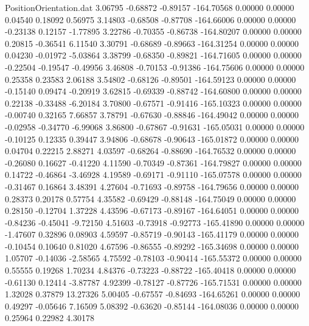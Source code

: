\begin{filecontents}{PositionOrientation.dat}
   3.06795   -0.68872   -0.89157  -164.70568    0.00000    0.00000    0.04540    0.18092    0.56975
   3.14803   -0.68508   -0.87708  -164.66006    0.00000    0.00000   -0.23138    0.12157   -1.77895
   3.22786   -0.70355   -0.86738  -164.80207    0.00000    0.00000    0.20815   -0.36541    6.11540
   3.30791   -0.68689   -0.89663  -164.31254    0.00000    0.00000    0.04230   -0.01972   -5.03864
   3.38799   -0.68350   -0.89821  -164.71605    0.00000    0.00000   -0.22504   -0.19547   -0.49956
   3.46808   -0.70153   -0.91386  -164.75606    0.00000    0.00000    0.25358    0.23583    2.06188
   3.54802   -0.68126   -0.89501  -164.59123    0.00000    0.00000   -0.15140    0.09474   -0.20919
   3.62815   -0.69339   -0.88742  -164.60800    0.00000    0.00000    0.22138   -0.33488   -6.20184
   3.70800   -0.67571   -0.91416  -165.10323    0.00000    0.00000   -0.00740    0.32165    7.66857
   3.78791   -0.67630   -0.88846  -164.49042    0.00000    0.00000   -0.02958   -0.34770   -6.99068
   3.86800   -0.67867   -0.91631  -165.05031    0.00000    0.00000   -0.10125    0.12335    0.39447
   3.94806   -0.68678   -0.90643  -165.01872    0.00000    0.00000    0.04704    0.22215    2.88271
   4.03597   -0.68264   -0.88690  -164.76532    0.00000    0.00000   -0.26080    0.16627   -0.41220
   4.11590   -0.70349   -0.87361  -164.79827    0.00000    0.00000    0.14722   -0.46864   -3.46928
   4.19589   -0.69171   -0.91110  -165.07578    0.00000    0.00000   -0.31467    0.16864    3.48391
   4.27604   -0.71693   -0.89758  -164.79656    0.00000    0.00000    0.28373    0.20178    0.57754
   4.35582   -0.69429   -0.88148  -164.75049    0.00000    0.00000    0.28150   -0.12704    1.37228
   4.43596   -0.67173   -0.89167  -164.64051    0.00000    0.00000   -0.84236   -0.45041   -9.72150
   4.51603   -0.73918   -0.92773  -165.41890    0.00000    0.00000   -1.47607    0.32896    0.08903
   4.59597   -0.85719   -0.90143  -165.41179    0.00000    0.00000   -0.10454    0.10640    0.81020
   4.67596   -0.86555   -0.89292  -165.34698    0.00000    0.00000    1.05707   -0.14036   -2.58565
   4.75592   -0.78103   -0.90414  -165.55372    0.00000    0.00000    0.55555    0.19268    1.70234
   4.84376   -0.73223   -0.88722  -165.40418    0.00000    0.00000   -0.61130    0.12414   -3.87787
   4.92399   -0.78127   -0.87726  -165.71531    0.00000    0.00000    1.32028    0.37879   13.27326
   5.00405   -0.67557   -0.84693  -164.65261    0.00000    0.00000    0.49297   -0.05646    7.16509
   5.08392   -0.63620   -0.85144  -164.08036    0.00000    0.00000    0.25964    0.22982    4.30178

\end{filecontents}
